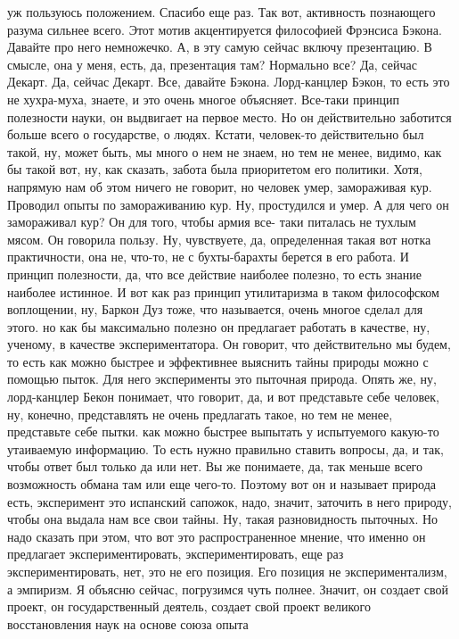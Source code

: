 уж пользуюсь положением. Спасибо еще раз. Так вот, активность познающего разума
сильнее всего. Этот мотив акцентируется философией Фрэнсиса Бэкона. Давайте про
него немножечко. А, в эту самую сейчас включу презентацию. В смысле, она у меня,
есть, да, презентация там? Нормально все? Да, сейчас Декарт. Да, сейчас Декарт.
Все, давайте Бэкона. Лорд-канцлер Бэкон, то есть это не хухра-муха, знаете, и
это очень многое объясняет. Все-таки принцип полезности науки, он выдвигает на
первое место. Но он действительно заботится больше всего о государстве, о людях.
Кстати, человек-то действительно был такой, ну, может быть, мы много о нем не
знаем, но тем не менее, видимо, как бы такой вот, ну, как сказать, забота была
приоритетом его политики. Хотя, напрямую нам об этом ничего не говорит, но
человек умер, замораживая кур. Проводил опыты по замораживанию кур. Ну,
простудился и умер. А для чего он замораживал кур? Он для того, чтобы армия все-
таки питалась не тухлым мясом. Он говорила пользу. Ну, чувствуете, да,
определенная такая вот нотка практичности, она не, что-то, не с бухты-барахты
берется в его работа. И принцип полезности, да, что все действие наиболее
полезно, то есть знание наиболее истинное. И вот как раз принцип утилитаризма в
таком философском воплощении, ну, Баркон Дуз тоже, что называется, очень многое
сделал для этого. но как бы максимально полезно он предлагает работать в
качестве, ну, ученому, в качестве экспериментатора. Он говорит, что
действительно мы будем, то есть как можно быстрее и эффективнее выяснить тайны
природы можно с помощью пыток. Для него эксперименты это пыточная природа. Опять
же, ну, лорд-канцлер Бекон понимает, что говорит, да, и вот представьте себе
человек, ну, конечно, представлять не очень предлагать такое, но тем не менее,
представьте себе пытки. как можно быстрее выпытать у испытуемого какую-то
утаиваемую информацию. То есть нужно правильно ставить вопросы, да, и так, чтобы
ответ был только да или нет. Вы же понимаете, да, так меньше всего возможность
обмана там или еще чего-то. Поэтому вот он и называет природа есть, эксперимент
это испанский сапожок, надо, значит, заточить в него природу, чтобы она выдала
нам все свои тайны. Ну, такая разновидность пыточных. Но надо сказать при этом,
что вот это распространенное мнение, что именно он предлагает
экспериментировать, экспериментировать, еще раз экспериментировать, нет, это не
его позиция. Его позиция не экспериментализм, а эмпиризм. Я объясню сейчас,
погрузимся чуть полнее. Значит, он создает свой проект, он государственный
деятель, создает свой проект великого восстановления наук на основе союза опыта
